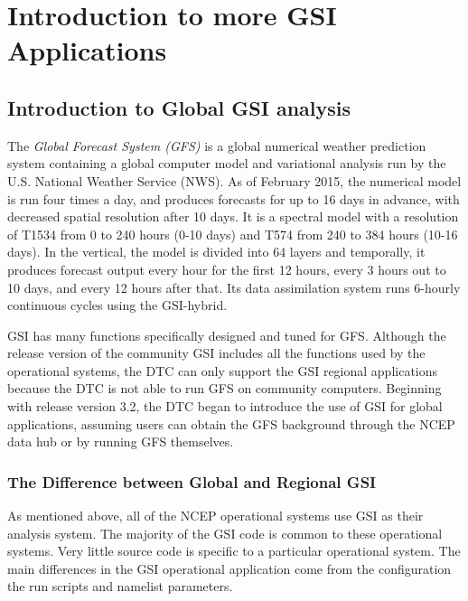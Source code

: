 \chapter{Introduction to more GSI Applications}\label{gsi_global}
\setlength{\parskip}{12pt}

\section{Introduction to Global GSI analysis}

The \textit{Global Forecast System (GFS)} is a global numerical weather prediction system containing a global computer model and variational analysis 
run by the U.S. National Weather Service (NWS). As of February 2015, the numerical model is run four times a day, and produces forecasts for up 
to 16 days in advance, with decreased spatial resolution after 10 days. It is a spectral model with a resolution of T1534 from 0 to 240 hours 
(0-10 days) and T574 from 240 to 384 hours (10-16 days). In the vertical, the model is divided into 64 layers and temporally, it produces forecast output 
every hour for the first 12 hours, every 3 hours out to 10 days, and every 12 hours after that. Its data assimilation system runs 6-hourly continuous cycles 
using the GSI-hybrid.

GSI has many functions specifically designed and tuned for GFS. Although the release version of the community GSI includes all the functions used by the 
operational systems, the DTC can only support the GSI regional applications because the DTC is not able to run GFS on community computers. Beginning 
with release version 3.2, the DTC began to introduce the use of GSI for global applications, assuming users can obtain the GFS background through the 
NCEP data hub or by running GFS themselves.

\subsection{The Difference between Global and Regional GSI}

As mentioned above, all of the NCEP operational systems use GSI as their analysis system. The majority of the GSI code is common to these 
operational systems. Very little source code is specific to a particular operational system. The main differences in the GSI operational application 
come from the configuration the run scripts and namelist parameters.

